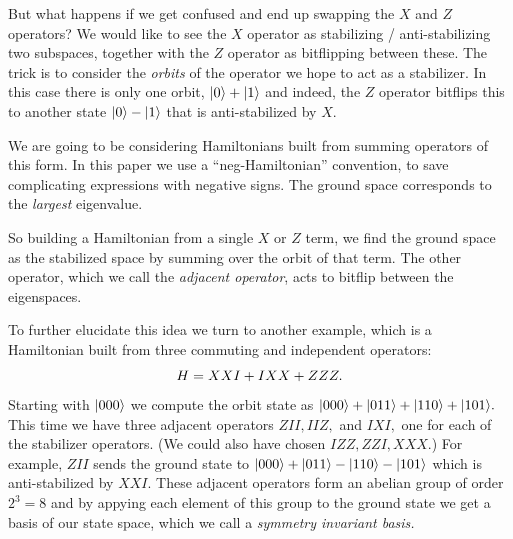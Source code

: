 But what happens if we get confused and end up swapping
the $X$ and $Z$ operators? We would like to see the $X$ operator
as stabilizing / anti-stabilizing two subspaces, together with the
$Z$ operator as bitflipping between these.
The trick is to consider the \emph{orbits} of the operator
we hope to act as a stabilizer.
In this case there is only one orbit, $|{0}\rangle+|{1}\rangle$
and indeed, the $Z$ operator bitflips this to another state
$|{0}\rangle-|{1}\rangle$ that is anti-stabilized by $X.$

We are going to be considering Hamiltonians built from
summing operators of this form.
In this paper we use a ``neg-Hamiltonian'' convention,
to save complicating expressions with negative signs.
The ground space corresponds to the \emph{largest} eigenvalue.

So building a Hamiltonian from a single $X$ or $Z$ term,
we find the ground space as the stabilized space
by summing over the orbit of that term.
The other operator,
which we call the \emph{adjacent operator}, acts to bitflip
between the eigenspaces.

To further elucidate this idea we turn to another example,
which is a Hamiltonian built from three commuting and
independent operators:
$$
    H = XXI + IXX + ZZZ.
$$
Starting with $|{000}\rangle$ we compute the orbit state
as $|{000}\rangle+|{011}\rangle+|{110}\rangle+|{101}\rangle.$
This time we have three adjacent operators
$ZII, IIZ,$ and $IXI,$
one for each of the stabilizer operators.
(We could also have chosen $IZZ, ZZI, XXX.$)
For example, $ZII$ sends the ground state to
$|{000}\rangle+|{011}\rangle-|{110}\rangle-|{101}\rangle$
which is anti-stabilized by $XXI.$
These adjacent operators form an abelian group of
order $2^3 = 8$ and by appying each element of
this group to the ground state we get a basis
of our state space, which we call a \emph{symmetry
invariant basis.}

